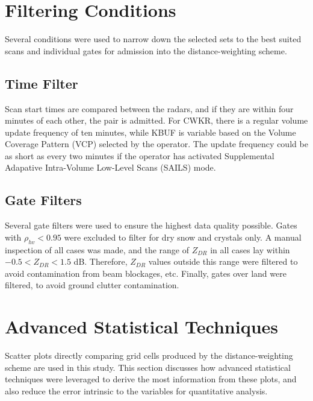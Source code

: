 \section{Filtering Conditions}
Several conditions were used to narrow down the selected sets to the best suited scans and individual gates for admission into the distance-weighting scheme.
\subsection{Time Filter}
Scan start times are compared between the radars, and if they are within four minutes of each other, the pair is admitted. For CWKR, there is a regular
volume update frequency of ten minutes, while KBUF is variable based on the Volume Coverage Pattern (VCP) selected by the operator. The update frequency
could be as short as every two minutes if the operator has activated Supplemental Adapative Intra-Volume Low-Level Scans (SAILS) mode.
\subsection{Gate Filters}
Several gate filters were used to ensure the highest data quality possible. Gates with $\rho_{hv} < 0.95$ were excluded to filter for dry snow and crystals
only. A manual inspection of all cases was made, and the range of $Z_{DR}$ in all cases lay within $-0.5 < Z_{DR} < 1.5$ dB. Therefore, $Z_{DR}$ values
outside this range were filtered to avoid contamination from beam blockages, etc. Finally, gates over land were filtered, to avoid ground clutter
contamination.
\section{Advanced Statistical Techniques}
Scatter plots directly comparing grid cells produced by the distance-weighting scheme are used in this study. This section discusses how advanced statistical
techniques were leveraged to derive the most information from these plots, and also reduce the error intrinsic to the variables for quantitative analysis.
